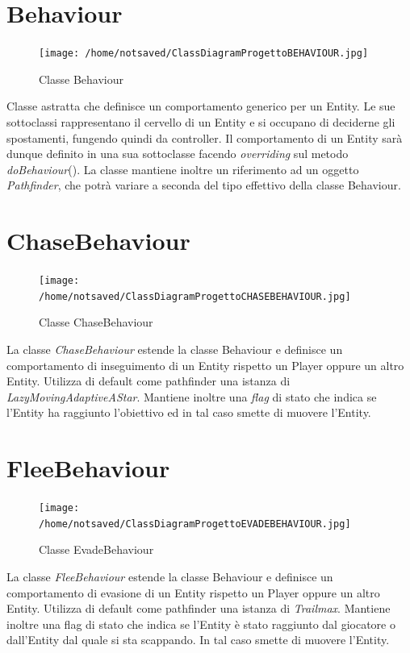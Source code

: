 \documentclass[11pt]{book}
\begin{document}
\section{Behaviour}

\begin{figure}[H]
\centering
\texttt{[image: /home/notsaved/ClassDiagramProgettoBEHAVIOUR.jpg]}
\caption{Classe Behaviour}
\label{classbehaviour}
\end{figure}

Classe astratta che definisce un comportamento generico per un Entity. Le sue sottoclassi rappresentano il cervello di un Entity e si occupano di deciderne gli spostamenti, fungendo quindi da controller. Il comportamento di un Entity sar\`a dunque definito in una sua sottoclasse facendo \emph{overriding} sul metodo \emph{doBehaviour}(). La classe mantiene inoltre un riferimento ad un oggetto \emph{Pathfinder}, che potr\`a variare a seconda del tipo effettivo della classe Behaviour.

\section{ChaseBehaviour}

\begin{figure}[H]
\centering
\texttt{[image: /home/notsaved/ClassDiagramProgettoCHASEBEHAVIOUR.jpg]}
\caption{Classe ChaseBehaviour}
\label{classchase}
\end{figure}

La classe \emph{ChaseBehaviour} estende la classe Behaviour e definisce un comportamento di inseguimento di un Entity rispetto un Player oppure un altro Entity. Utilizza di default come pathfinder una istanza di \emph{LazyMovingAdaptiveAStar}. Mantiene inoltre una \emph{flag} di stato che indica se l'Entity ha raggiunto l'obiettivo ed in tal caso smette di muovere l'Entity.

\section{FleeBehaviour}

\begin{figure}[htp]
\centering
\texttt{[image: /home/notsaved/ClassDiagramProgettoEVADEBEHAVIOUR.jpg]}
\caption{Classe EvadeBehaviour}
\label{classevade}
\end{figure}

La classe \emph{FleeBehaviour} estende la classe Behaviour e definisce un comportamento di evasione di un Entity rispetto un Player oppure un altro Entity. Utilizza di default come pathfinder una istanza di \emph{Trailmax}. Mantiene inoltre una flag di stato che indica se l'Entity \`e stato raggiunto dal giocatore o dall'Entity dal quale si sta scappando. In tal caso smette di muovere l'Entity.
\end{document}
